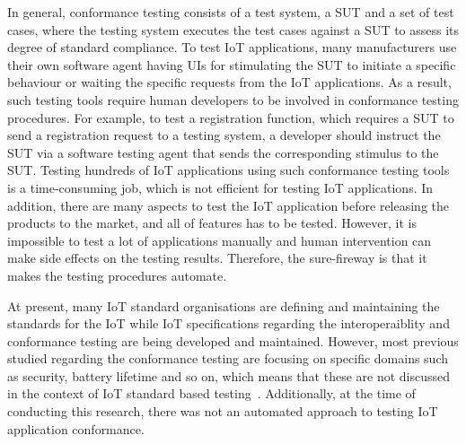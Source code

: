 In general, conformance testing consists of a test system, a SUT and a set of test cases, where the testing system executes the test cases against a SUT to assess its degree of standard compliance. To test IoT applications, many manufacturers use their own software agent having UIs for stimulating the SUT to initiate a specific behaviour or waiting the specific requests from the IoT applications. As a result, such testing tools require human developers to be involved in conformance testing procedures. For example, to test a registration function, which requires a SUT to send a registration request to a testing system, a developer should instruct the SUT via a software testing agent that sends the corresponding stimulus to the SUT. Testing hundreds of IoT applications using such conformance testing tools is a time-consuming job, which is not efficient for testing IoT applications. In addition, there are many aspects to test the IoT application before releasing the products to the market, and all of features has to be tested. However, it is impossible to test a lot of applications manually and human intervention can make side effects on the testing results. Therefore, the sure-fireway is that it makes the testing procedures automate.

At present, many IoT standard organisations are defining and maintaining the standards for the IoT while IoT specifications regarding the interoperaiblity and conformance testing are being developed and maintained. However, most previous studied regarding the conformance testing are focusing on specific domains such as security, battery lifetime and so on, which means that these are not discussed in the context of IoT standard based testing~\cite{kim2018iot}. Additionally, at the time of conducting this research, there was not an automated approach to testing IoT application conformance. 

